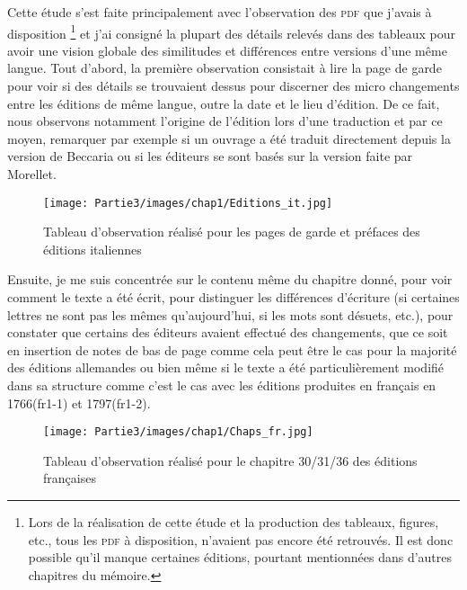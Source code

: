 Cette étude s'est faite principalement avec l'observation des \textsc{pdf} que j'avais à disposition \footnote{Lors de la réalisation de cette étude et la production des tableaux, figures, etc., tous les \textsc{pdf} à disposition, n'avaient pas encore été retrouvés. Il est donc possible qu'il manque certaines éditions, pourtant mentionnées dans d'autres chapitres du mémoire.} et j'ai consigné la plupart des détails relevés dans des tableaux pour avoir une vision globale des similitudes et différences entre versions d'une même langue. Tout d'abord, la première observation consistait à lire la page de garde pour voir si des détails se trouvaient dessus pour discerner des micro changements entre les éditions de même langue, outre la date et le lieu d'édition. De ce fait, nous observons notamment l'origine de l'édition lors d'une traduction et par ce moyen, remarquer par exemple si un ouvrage a été traduit directement depuis la version de Beccaria ou si les éditeurs se sont basés sur la version faite par Morellet.
\begin{figure}[H]
    \centering
    \texttt{[image: Partie3/images/chap1/Editions\_it.jpg]}
    \caption{Tableau d'observation réalisé pour les pages de garde et préfaces des éditions italiennes}
    \label{fig:editions_it}
\end{figure}
Ensuite, je me suis concentrée sur le contenu même du chapitre donné, pour voir comment le texte a été écrit, pour distinguer les différences d'écriture (si certaines lettres ne sont pas les mêmes qu'aujourd'hui, si les mots sont désuets, etc.), pour constater que certains des éditeurs avaient effectué des changements, que ce soit en insertion de notes de bas de page comme cela peut être le cas pour la majorité des éditions allemandes ou bien même si le texte a été particulièrement modifié dans sa structure comme c'est le cas avec les éditions produites en français en 1766(fr1-1) et 1797(fr1-2).
\begin{figure}[H]
    \centering
    \texttt{[image: Partie3/images/chap1/Chaps\_fr.jpg]}
    \caption{Tableau d'observation réalisé pour le chapitre 30/31/36 des éditions françaises}
    \label{fig:editions_fr}
\end{figure}

